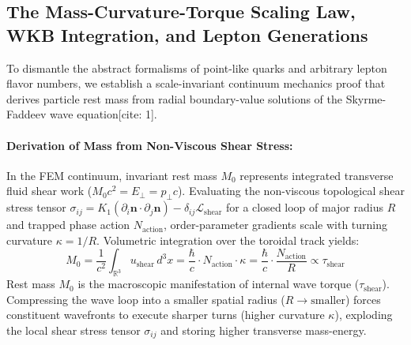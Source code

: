 \documentclass[11pt,a4paper]{article}
\begin{document}
	\subsection{The Mass-Curvature-Torque Scaling Law, WKB Integration, and Lepton Generations}
	To dismantle the abstract formalisms of point-like quarks and arbitrary lepton flavor numbers, we establish a scale-invariant continuum mechanics proof that derives particle rest mass from radial boundary-value solutions of the Skyrme-Faddeev wave equation[cite: 1].
	
	\paragraph{Derivation of Mass from Non-Viscous Shear Stress:}
	In the FEM continuum, invariant rest mass $M_0$ represents integrated transverse fluid shear work ($M_0 c^2 = E_\perp = p_\perp c$). Evaluating the non-viscous topological shear stress tensor $\sigma_{ij} = K_1 (\partial_i \mathbf{n} \cdot \partial_j \mathbf{n}) - \delta_{ij} \mathcal{L}_{\text{shear}}$ for a closed loop of major radius $R$ and trapped phase action $N_{\text{action}}$, order-parameter gradients scale with turning curvature $\kappa = 1/R$. Volumetric integration over the toroidal track yields:
	\begin{equation}
		M_0 = \frac{1}{c^2} \int_{\mathbb{R}^3} u_{\text{shear}} \, d^3x = \frac{\hbar}{c} \cdot N_{\text{action}} \cdot \kappa = \frac{\hbar}{c} \cdot \frac{N_{\text{action}}}{R} \propto \tau_{\text{shear}}
	\end{equation}
	Rest mass $M_0$ is the macroscopic manifestation of internal wave torque ($\tau_{\text{shear}}$). Compressing the wave loop into a smaller spatial radius ($R \to \text{smaller}$) forces constituent wavefronts to execute sharper turns (higher curvature $\kappa$), exploding the local shear stress tensor $\sigma_{ij}$ and storing higher transverse mass-energy.
	
\end{document}
